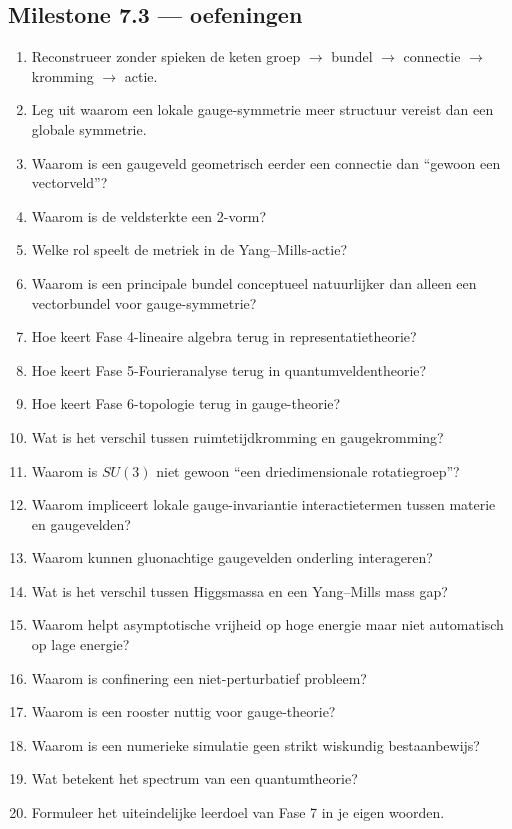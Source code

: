 \documentclass[11pt,a4paper]{article}
\begin{document}
\subsection{Milestone 7.3 --- oefeningen}

\begin{enumerate}
\item Reconstrueer zonder spieken de keten groep $\to$ bundel $\to$ connectie $\to$ kromming $\to$ actie.
\item Leg uit waarom een lokale gauge-symmetrie meer structuur vereist dan een globale symmetrie.
\item Waarom is een gaugeveld geometrisch eerder een connectie dan ``gewoon een vectorveld''?
\item Waarom is de veldsterkte een 2-vorm?
\item Welke rol speelt de metriek in de Yang--Mills-actie?
\item Waarom is een principale bundel conceptueel natuurlijker dan alleen een vectorbundel voor gauge-symmetrie?
\item Hoe keert Fase 4-lineaire algebra terug in representatietheorie?
\item Hoe keert Fase 5-Fourieranalyse terug in quantumveldentheorie?
\item Hoe keert Fase 6-topologie terug in gauge-theorie?
\item Wat is het verschil tussen ruimtetijdkromming en gaugekromming?
\item Waarom is $SU(3)$ niet gewoon ``een driedimensionale rotatiegroep''?
\item Waarom impliceert lokale gauge-invariantie interactietermen tussen materie en gaugevelden?
\item Waarom kunnen gluonachtige gaugevelden onderling interageren?
\item Wat is het verschil tussen Higgsmassa en een Yang--Mills mass gap?
\item Waarom helpt asymptotische vrijheid op hoge energie maar niet automatisch op lage energie?
\item Waarom is confinering een niet-perturbatief probleem?
\item Waarom is een rooster nuttig voor gauge-theorie?
\item Waarom is een numerieke simulatie geen strikt wiskundig bestaanbewijs?
\item Wat betekent het spectrum van een quantumtheorie?
\item Formuleer het uiteindelijke leerdoel van Fase 7 in je eigen woorden.
\end{enumerate}
\end{document}
